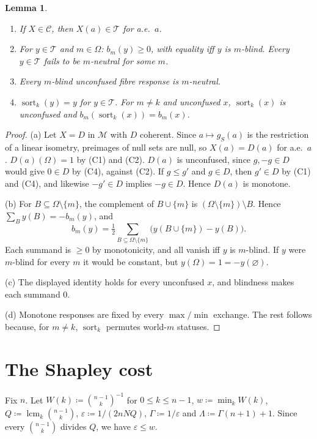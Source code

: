 \documentclass[11pt]{article}
\newcommand{\chg}[1]{{\color{red}#1}}
\newtheorem{lemma}[theorem]{Lemma}
\theoremstyle{definition}
\theoremstyle{remark}
\newcommand{\M}{\mathcal M}
\newcommand{\C}{\mathcal C}
\newcommand{\T}{\mathcal T}
\begin{document}
\begin{lemma}\label{lem:fibres}
\begin{enumerate}[label=\textup{(\alph*)}]
\item If $X\in\C$, then $X(a)\in\T$ for a.e.\ $a$.
\item For $y\in\T$ and $m\in\Omega$: $b_m(y)\ge0$, with equality iff $y$ is $m$-blind. Every $y\in\T$ fails to be $m$-neutral for some $m$.
\item Every $m$-blind unconfused fibre response is $m$-neutral.
\item $\operatorname{sort}_k(y)=y$ for $y\in\T$. For $m\neq k$ and unconfused $x$, $\operatorname{sort}_k(x)$ is unconfused and $b_m(\operatorname{sort}_k(x))=b_m(x)$.
\end{enumerate}
\end{lemma}
\begin{proof}
(a) Let $X=D$ in $\M$ with $D$ coherent. \chg{Since $a\mapsto g_S(a)$ is the restriction of a linear isometry, preimages of null sets are null, so} $X(a)=D(a)$ for a.e.\ $a$. $D(a)(\Omega)=1$ by (C1) and (C2). $D(a)$ is unconfused, since $g,-g\in D$ would give $0\in D$ by (C4), against (C2). If $g\le g'$ and $g\in D$, then $g'\in D$ by (C1) and (C4), and likewise $-g'\in D$ implies $-g\in D$. Hence $D(a)$ is monotone.

(b) For $B\subseteq\Omega\setminus\{m\}$, the complement of $B\cup\{m\}$ is $(\Omega\setminus\{m\})\setminus B$. Hence $\sum_{B}y(B)=-b_m(y)$, and
\[
b_m(y)=\tfrac12\sum_{B\subseteq\Omega\setminus\{m\}}\bigl(y(B\cup\{m\})-y(B)\bigr).
\]
Each summand is $\ge0$ by monotonicity, and all vanish iff $y$ is $m$-blind. If $y$ were $m$-blind for every $m$ it would be constant, but $y(\Omega)=1=-y(\varnothing)$.

(c) The displayed identity holds for every unconfused $x$, and blindness makes each summand $0$.

(d) Monotone responses are fixed by every $\max/\min$ exchange. The rest follows because, for $m\neq k$, $\operatorname{sort}_k$ permutes world-$m$ statuses.
\end{proof}

\section{The Shapley cost}\label{sec:shapley}

Fix $n$. Let $W(k)\coloneqq\binom{n-1}{k}^{-1}$ for $0\le k\le n-1$, $w\coloneqq\min_kW(k)$, $Q\coloneqq\operatorname{lcm}_k\binom{n-1}{k}$, $\varepsilon\coloneqq1/(2nNQ)$, $\Gamma\coloneqq1/\varepsilon$ and $\Lambda\coloneqq\Gamma(n+1)+1$. Since every $\binom{n-1}{k}$ divides $Q$, we have $\varepsilon\le w$.
\end{document}
